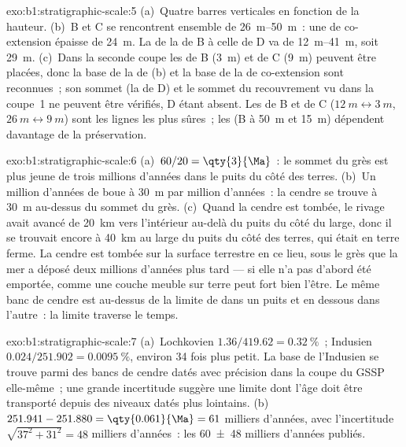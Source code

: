 \begin{solution}{exo:b1:stratigraphic-scale:5}
(a)~Quatre barres verticales en fonction de la hauteur. (b)~B et C se rencontrent ensemble de
\qtyrange{26}{50}{m}~: une  de co-extension épaisse de \qty{24}{m}. La  de la  de B à celle de D va de \qtyrange{12}{41}{m},
soit \qty{29}{m}. (c)~Dans la seconde coupe les  de B (\qty{3}{m})
et de C (\qty{9}{m}) peuvent être placées, donc la base de la  de (b) et
la base de la  de co-extension sont reconnues~; son sommet (la  de D) et le sommet du recouvrement vu dans la coupe~1 ne peuvent être vérifiés,
D étant absent. Les  de B et de C ($\qty{12}{m} \leftrightarrow
\qty{3}{m}$, $\qty{26}{m} \leftrightarrow \qty{9}{m}$) sont les lignes les plus sûres~; les
 (B à \qty{50}{m} et \qty{15}{m}) dépendent davantage de la préservation.
\end{solution}

\begin{solution}{exo:b1:stratigraphic-scale:6}
(a)~$60/20 = \qty{3}{\Ma}$~: le sommet du grès est plus jeune de trois millions d'années
dans le puits du côté des terres. (b)~Un million d'années de boue à \qty{30}{m} par
million d'années~: la cendre se trouve à \qty{30}{m} au-dessus du sommet du grès.
(c)~Quand la cendre est tombée, le rivage avait avancé de \qty{20}{km} vers l'intérieur au-delà du puits
du côté du large, donc il se trouvait encore à \qty{40}{km} au large du puits du côté des terres, qui était
en terre ferme. La cendre est tombée sur la surface terrestre en ce lieu, sous le grès que la
mer a déposé deux millions d'années plus tard --- si elle n'a pas d'abord été emportée,
comme une couche meuble sur terre peut fort bien l'être. Le même banc de cendre est au-dessus de la limite de  dans
un puits et en dessous dans l'autre~: la limite traverse le temps.
\end{solution}

\begin{solution}{exo:b1:stratigraphic-scale:7}
(a)~Lochkovien $1.36/419.62 = \qty{0.32}{\%}$~; Indusien $0.024/251.902 =
\qty{0.0095}{\%}$, environ 34 fois plus petit. La base de l'Indusien se trouve parmi des bancs de cendre
datés avec précision dans la coupe du GSSP elle-même~; une grande incertitude suggère une
limite dont l'âge doit être transporté depuis des niveaux datés plus lointains.
(b)~$251.941 - 251.880 = \qty{0.061}{\Ma} = 61$ milliers d'années, avec
l'incertitude $\sqrt{37^2 + 31^2} = 48$ milliers d'années~: les
\num[uncertainty-mode=separate]{60 \pm 48} milliers d'années publiés.
\end{solution}

